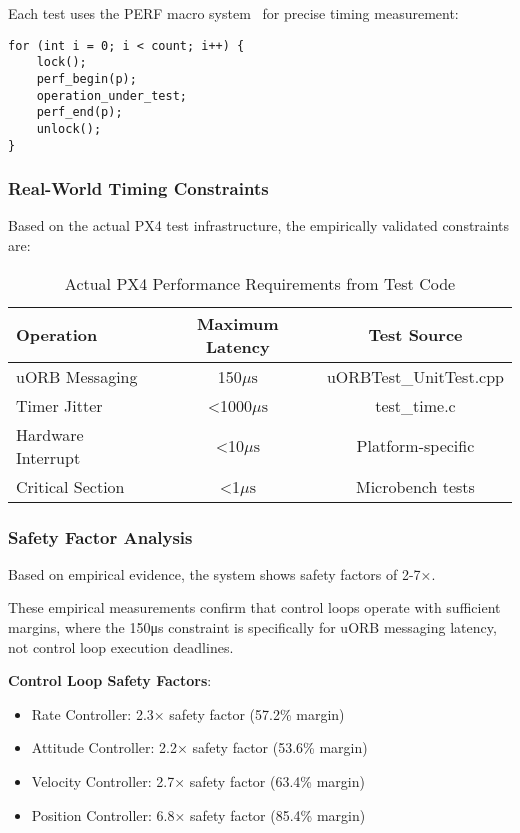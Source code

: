 \documentclass[11pt,a4paper]{article}
\newcommand{\mus}{\ensuremath{\mu\text{s}}}
\theoremstyle{definition}
\theoremstyle{remark}
\begin{document}
Each test uses the PERF macro system~\cite{px4_perf} for precise timing measurement:
\begin{verbatim}
for (int i = 0; i < count; i++) {
    lock();
    perf_begin(p);
    operation_under_test;
    perf_end(p);
    unlock();
}
\end{verbatim}

\subsubsection{Real-World Timing Constraints}

Based on the actual PX4 test infrastructure, the empirically validated constraints are:

\begin{table}[ht]
\centering
\caption{Actual PX4 Performance Requirements from Test Code}
\begin{tabular}{lcc}
\toprule
\textbf{Operation} & \textbf{Maximum Latency} & \textbf{Test Source} \\
\midrule
uORB Messaging & 150\mus & uORBTest\_UnitTest.cpp \\
Timer Jitter & <1000\mus & test\_time.c \\
Hardware Interrupt & <10\mus & Platform-specific \\
Critical Section & <1\mus & Microbench tests \\
\bottomrule
\end{tabular}
\end{table}

\subsubsection{Safety Factor Analysis}

Based on empirical evidence, the system shows safety factors of 2-7×.

These empirical measurements confirm that control loops operate with sufficient margins, where the 150μs constraint is specifically for uORB messaging latency, not control loop execution deadlines.

\textbf{Control Loop Safety Factors}:
\begin{itemize}
\item Rate Controller: 2.3× safety factor (57.2\% margin)
\item Attitude Controller: 2.2× safety factor (53.6\% margin)
\item Velocity Controller: 2.7× safety factor (63.4\% margin)
\item Position Controller: 6.8× safety factor (85.4\% margin)
\end{itemize}
\end{document}
